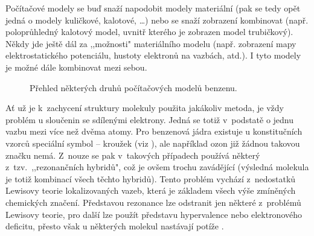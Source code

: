 Počítačové modely se buď snaží napodobit modely materiální (pak se tedy opět
jedná o modely kuličkové, kalotové, \dots) nebo se snaží zobrazení kombinovat
(např. poloprůhledný kalotový model, uvnitř kterého je zobrazen model
trubičkový). Někdy jde ještě dál za ,,možnosti" materiálního modelu (např.
zobrazení mapy elektrostatického potenciálu, hustoty elektronů na vazbách, atd.).
I tyto modely je možné dále kombinovat mezi sebou.

\begin{figure}[h]
	\caption{Přehled některých druhů počítačových modelů benzenu.}
\end{figure}

Ať už je k~zachycení struktury molekuly použita jakákoliv metoda, je vždy
problém u sloučenin se sdílenými elektrony. Jedná se totiž v~podstatě o jednu
vazbu mezi více než dvěma atomy. Pro benzenová jádra existuje u konstitučních
vzorců speciální symbol -- kroužek (viz ), ale například ozon
již žádnou takovou značku nemá. Z~nouze se pak v~takových případech používá
některý z~tzv.~,,rezonančních hybridů", což je ovšem trochu zavádějící (výsledná
molekula je totiž kombinací všech těchto hybridů). Tento problém vychází
z~nedostatků Lewisovy teorie lokalizovaných vazeb, která je základem všech výše
zmíněných chemických značení. Představou rezonance lze odstranit jen některé
z~problémů Lewisovy teorie, pro další lze použít představu hypervalence nebo
elektronového deficitu, přesto však u některých molekul nastávají potíže
\cite{Micka:anorgana}.
